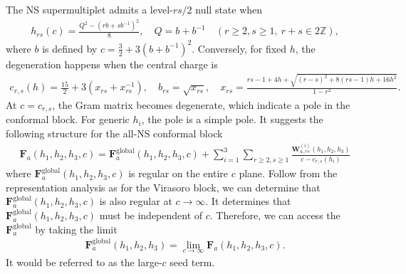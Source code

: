 \documentclass[12pt]{article}
\newcommand{\ie}{\begin{equation}\begin{aligned}}
\newcommand{\fe}{\end{aligned}\end{equation}}
\numberwithin{equation}{section}
\begin{document}
The NS supermultiplet admits a level-$rs/2$ null state when
\ie
h_{rs}(c) = \frac{Q^2-(rb+sb^{-1})^2}{8}, \quad Q=b+b^{-1}\quad (r\geq 2,s\geq 1, \ r+s\in 2\mathbb{Z}),
\fe
where $b$ is defined by $c= \frac{3}{2}+3(b+b^{-1})^2$. Conversely, for fixed $h$, the degeneration happens when the central charge is
\ie
c_{r,s}(h) = \frac{15}{2}+3(x_{rs}+x_{rs}^{-1}),\quad b_{rs} = \sqrt{x_{rs}},\quad x_{rs} = \frac{r s-1+4 h+\sqrt{(r-s)^2+8(r s-1) h+16 h^2}}{1-r^2}.
\fe
At $c=c_{r,s}$, the Gram matrix becomes degenerate, which indicate a pole in the conformal block. For generic $h_i$, the pole is a simple pole. It suggests the following structure for the all-NS conformal block
\ie
\mathbf{F}_a(h_1, h_2, h_3, c)= \mathbf{F}^{\text{global}}_a(h_1,h_2,h_3,c)+\sum_{i=1}^3 \sum_{r\geq 2,s\geq 1} \frac{\mathbf{W}^{(i)}_{a,rs}(h_1,h_2,h_3)}{c-c_{r,s}(h_i)}
\fe
where $\mathbf{F}^{\text{global}}_a(h_1,h_2,h_3,c)$ is regular on the entire $c$ plane. Follow from the representation analysis as for the Virasoro block, we can determine that $\mathbf{F}^{\text{global}}_a(h_1,h_2,h_3,c)$ is also regular at $c\rightarrow \infty$. It determines that $ \mathbf{F}^{\text{global}}_a(h_1,h_2,h_3,c)$ must be independent of $c$. Therefore, we can access the $\mathbf{F}^{\text{global}}_a$ by taking the limit
\ie
\mathbf{F}^{\text{global}}_a(h_1,h_2,h_3) = \lim_{c\rightarrow \infty} \mathbf{F}_a(h_1, h_2, h_3, c).
\fe
It would be referred to as the large-$c$ seed term. 
\end{document}
